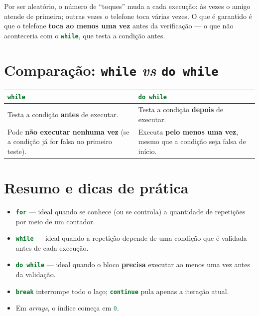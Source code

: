 \documentclass[12pt,a4paper]{article}
\newcommand{\codigo}[1]{\lstinline[language=Java,basicstyle=\ttfamily\small]|#1|}
\begin{document}
\begin{observacao}
Por ser aleatório, o número de ``toques'' muda a cada execução: às vezes o amigo
atende de primeira; outras vezes o telefone toca várias vezes. O que é garantido é
que o telefone \textbf{toca ao menos uma vez} antes da verificação --- o que não
aconteceria com o \codigo{while}, que testa a condição antes.
\end{observacao}

\section{Comparação: \texttt{while} \textit{vs} \texttt{do while}}

\begin{center}
\begin{tabular}{p{} p{}}
  \hline
  \textbf{\codigo{while}} & \textbf{\codigo{do while}} \\
  \hline
  Testa a condição \textbf{antes} de executar. & Testa a condição \textbf{depois}
  de executar. \\
  Pode \textbf{não executar nenhuma vez} (se a condição já for falsa no primeiro
  teste). & Executa \textbf{pelo menos uma vez}, mesmo que a condição seja falsa
  de início. \\
  \hline
\end{tabular}
\end{center}

\section{Resumo e dicas de prática}

\begin{itemize}
  \item \codigo{for} --- ideal quando se conhece (ou se controla) a quantidade de
        repetições por meio de um contador.
  \item \codigo{while} --- ideal quando a repetição depende de uma condição que é
        validada antes de cada execução.
  \item \codigo{do while} --- ideal quando o bloco \textbf{precisa} executar ao
        menos uma vez antes da validação.
  \item \codigo{break} interrompe todo o laço; \codigo{continue} pula apenas a
        iteração atual.
  \item Em \emph{arrays}, o índice começa em \codigo{0}.
\end{itemize}
\end{document}
